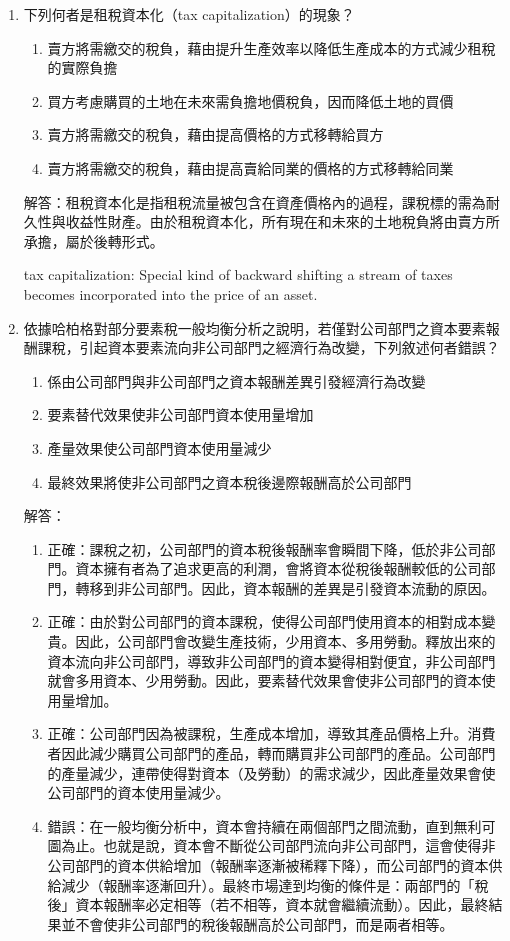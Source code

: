 \documentclass[12pt, a4paper]{article}
\begin{document}
\begin{enumerate}
    \item 下列何者是租稅資本化（tax capitalization）的現象？
    \begin{enumerate}[label=\Alph*.]
        \item 賣方將需繳交的稅負，藉由提升生產效率以降低生產成本的方式減少租稅的實際負擔
        \item 買方考慮購買的土地在未來需負擔地價稅負，因而降低土地的買價
        \item 賣方將需繳交的稅負，藉由提高價格的方式移轉給買方
        \item 賣方將需繳交的稅負，藉由提高賣給同業的價格的方式移轉給同業
    \end{enumerate}
    解答：租稅資本化是指租稅流量被包含在資產價格內的過程，課稅標的需為耐久性與收益性財產。由於租稅資本化，所有現在和未來的土地稅負將由賣方所承擔，屬於後轉形式。

    tax capitalization: Special kind of backward shifting a stream of taxes becomes incorporated into the price of an asset.

    \item 依據哈柏格對部分要素稅一般均衡分析之說明，若僅對公司部門之資本要素報酬課稅，引起資本要素流向非公司部門之經濟行為改變，下列敘述何者錯誤？
    \begin{enumerate}[label=\Alph*.]
        \item 係由公司部門與非公司部門之資本報酬差異引發經濟行為改變
        \item 要素替代效果使非公司部門資本使用量增加
        \item 產量效果使公司部門資本使用量減少
        \item 最終效果將使非公司部門之資本稅後邊際報酬高於公司部門
    \end{enumerate}
    解答：
    \begin{enumerate}[label=\Alph*.]
        \item 正確：課稅之初，公司部門的資本稅後報酬率會瞬間下降，低於非公司部門。資本擁有者為了追求更高的利潤，會將資本從稅後報酬較低的公司部門，轉移到非公司部門。因此，資本報酬的差異是引發資本流動的原因。
        \item 正確：由於對公司部門的資本課稅，使得公司部門使用資本的相對成本變貴。因此，公司部門會改變生產技術，少用資本、多用勞動。釋放出來的資本流向非公司部門，導致非公司部門的資本變得相對便宜，非公司部門就會多用資本、少用勞動。因此，要素替代效果會使非公司部門的資本使用量增加。
        \item 正確：公司部門因為被課稅，生產成本增加，導致其產品價格上升。消費者因此減少購買公司部門的產品，轉而購買非公司部門的產品。公司部門的產量減少，連帶使得對資本（及勞動）的需求減少，因此產量效果會使公司部門的資本使用量減少。
        \item 錯誤：在一般均衡分析中，資本會持續在兩個部門之間流動，直到無利可圖為止。也就是說，資本會不斷從公司部門流向非公司部門，這會使得非公司部門的資本供給增加（報酬率逐漸被稀釋下降），而公司部門的資本供給減少（報酬率逐漸回升）。最終市場達到均衡的條件是：兩部門的「稅後」資本報酬率必定相等（若不相等，資本就會繼續流動）。因此，最終結果並不會使非公司部門的稅後報酬高於公司部門，而是兩者相等。
    \end{enumerate}


\end{enumerate}
\end{document}
